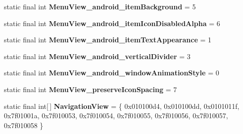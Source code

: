 \begin{DoxyCompactItemize}
\item 
\hypertarget{classandroid_1_1support_1_1design_1_1_r_1_1styleable_a5db21fb17308a868d9c88a641e23e10f}{}static final int {\bfseries Menu\+View\+\_\+android\+\_\+item\+Background} = 5\label{classandroid_1_1support_1_1design_1_1_r_1_1styleable_a5db21fb17308a868d9c88a641e23e10f}

\item 
\hypertarget{classandroid_1_1support_1_1design_1_1_r_1_1styleable_a0798b766a0bf98edc65330f9686e5ce1}{}static final int {\bfseries Menu\+View\+\_\+android\+\_\+item\+Icon\+Disabled\+Alpha} = 6\label{classandroid_1_1support_1_1design_1_1_r_1_1styleable_a0798b766a0bf98edc65330f9686e5ce1}

\item 
\hypertarget{classandroid_1_1support_1_1design_1_1_r_1_1styleable_a7a53c46d2afe09a8f3a1ba5c28c757f7}{}static final int {\bfseries Menu\+View\+\_\+android\+\_\+item\+Text\+Appearance} = 1\label{classandroid_1_1support_1_1design_1_1_r_1_1styleable_a7a53c46d2afe09a8f3a1ba5c28c757f7}

\item 
\hypertarget{classandroid_1_1support_1_1design_1_1_r_1_1styleable_a08c33b701e90e1157d2bb6ff33d34134}{}static final int {\bfseries Menu\+View\+\_\+android\+\_\+vertical\+Divider} = 3\label{classandroid_1_1support_1_1design_1_1_r_1_1styleable_a08c33b701e90e1157d2bb6ff33d34134}

\item 
\hypertarget{classandroid_1_1support_1_1design_1_1_r_1_1styleable_a34456b5445aaf302afb7e7acb7887c20}{}static final int {\bfseries Menu\+View\+\_\+android\+\_\+window\+Animation\+Style} = 0\label{classandroid_1_1support_1_1design_1_1_r_1_1styleable_a34456b5445aaf302afb7e7acb7887c20}

\item 
\hypertarget{classandroid_1_1support_1_1design_1_1_r_1_1styleable_ae40116afa0e62bdf6af6d28c82e6a05e}{}static final int {\bfseries Menu\+View\+\_\+preserve\+Icon\+Spacing} = 7\label{classandroid_1_1support_1_1design_1_1_r_1_1styleable_ae40116afa0e62bdf6af6d28c82e6a05e}

\item 
\hypertarget{classandroid_1_1support_1_1design_1_1_r_1_1styleable_a277c199f371e8804c26e2cd6dbf88999}{}static final int\mbox{[}$\,$\mbox{]} {\bfseries Navigation\+View} = \{ 0x010100d4, 0x010100dd, 0x0101011f, 0x7f01001a, 0x7f010053, 0x7f010054, 0x7f010055, 0x7f010056, 0x7f010057, 0x7f010058 \}\label{classandroid_1_1support_1_1design_1_1_r_1_1styleable_a277c199f371e8804c26e2cd6dbf88999}


\end{DoxyCompactItemize}
